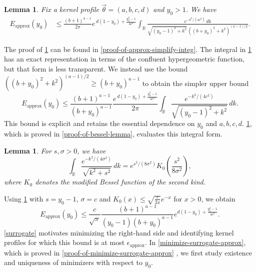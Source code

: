 \documentclass[10pt,reqno]{article}
\numberwithin{equation}{section}
\theoremstyle{plain}
\newtheorem{lem}[thm]{Lemma}
\theoremstyle{definition}
\begin{document}
\begin{lem}\label{approx-simplify-integ}
Fix a kernel profile \(\vec{\theta} = (a,b,c,d)\) and \(y_0 > 1\). We have
\begin{align}
E_{\mathrm{approx}}(y_0) &\leq \frac{(b+1)^{a-1}}{2\pi}e^{\,d(1-y_0)+\frac{y_0^2-1}{4c^2}}\int_{\mathbb{R}}\frac{e^{-k^2/(4c^2)}\,dk}{\sqrt{(y_0-1)^2+k^2}\,((b+y_0)^2+k^2)^{(a-1)/2}}.
\label{simplified-eq}
\end{align}
\end{lem}

The proof of \cref{approx-simplify-integ} can be found in \cref{proof-of-approx-simplify-integ}. The integral in \cref{approx-simplify-integ} has an exact representation in terms of the confluent hypergeometric function, but that form is less transparent. We instead use the bound \(((b+y_0)^2+k^2)^{(a-1)/2}\geq (b+y_0)^{a-1}\) to obtain the simpler upper bound
\begin{equation}\label{bessel-integ}
E_{\mathrm{approx}}(y_0) \le \frac{(b+1)^{a-1}}{(b+y_0)^{a-1}}\frac{e^{\,d(1-y_0)+\frac{y_0^2-1}{4c^2}}}{2\pi}\int_{\mathbb{R}}\frac{e^{-k^2/(4c^2)}}{\sqrt{(y_0-1)^2+k^2}}\,dk.
\end{equation}
This bound is explicit and retains the essential dependence on \(y_0\) and \(a,b,c,d\). \cref{bessel-lemma}, which is proved in \cref{proof-of-bessel-lemma}, evaluates this integral form.

\begin{lem}\label{bessel-lemma}
For \(s,\sigma>0\), we have
\begin{equation}\label{bessel-eq}
\int_{\mathbb{R}}\frac{e^{-k^2/(4\sigma^2)}}{\sqrt{k^2+s^2}}\,dk = e^{s^2/(8\sigma^2)}K_0\left(\frac{s^2}{8\sigma^2}\right),
\end{equation}
where \(K_0\) denotes the modified Bessel function of the second kind.
\end{lem}

Using \cref{bessel-lemma} with \(s=y_0-1\), \(\sigma=c\) and \(K_0(x)\leq \sqrt{\frac{\pi}{2x}}e^{-x}\) for \(x>0\), we obtain
\begin{equation}\label{surrogate}
E_{\mathrm{approx}}(y_0) \le \frac{c}{\sqrt{\pi}}\frac{(b+1)^{a-1}}{(y_0-1)(b+y_0)^{a-1}}e^{d(1-y_0)+\frac{y_0^2-1}{4c^2}}.
\end{equation}
\cref{surrogate} motivates minimizing the right-hand side and identifying kernel profiles for which this bound is at most \(\epsilon_{\operatorname{approx}}\). In \cref{minimize-surrogate-approx}, which is proved in \cref{proof-of-minimize-surrogate-approx} , we first study existence and uniqueness of minimizers with respect to \(y_0\).
\end{document}
